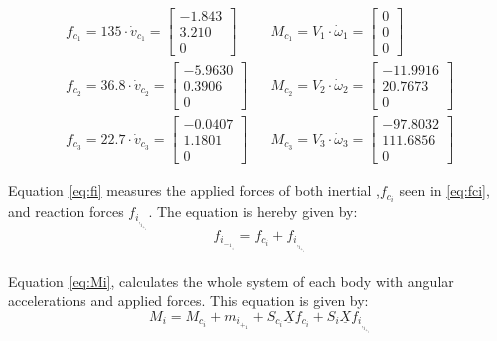 \begin{align}
    f_c_1=135\cdot \dot{v}_c_1=\left[\begin{matrix}
    -1.843\\
    3.210\\
    0
\end{matrix}\right]&&
    M_c_1=V_1\cdot \dot{\omega}_1=\left[\begin{matrix}
    0\\
    0\\
    0
\end{matrix}\right]\\
    f_c_2=36.8\cdot \dot{v}_c_2= \left[\begin{matrix}
    -5.9630\\
    0.3906\\
    0
\end{matrix}\right]&&
  M_c_2=V_2\cdot \dot{\omega}_2= \left[\begin{matrix}
    -11.9916\\
    20.7673\\
    0
\end{matrix}\right]\\
 f_c_3=22.7\cdot \dot{v}_c_3=\left[\begin{matrix}
    -0.0407\\
    1.1801\\
    0
\end{matrix}\right]&&
    M_c_3=V_3\cdot \dot{\omega}_3=\left[\begin{matrix}
    -97.8032\\
    111.6856\\
    0
\end{matrix}\right]
\end{align}

\noindent
Equation \ref{eq:fi} measures the applied forces of both inertial ,\(f_c_i\) seen in \ref{eq:fci}, and reaction forces \(f_i_,_i_+_1\). The equation is hereby given by:\\
\begin{equation}\label{eq:fi}
    f_i_-_1_,_i=f_c_i+f_i_,_i_+_1
\end{equation} \\

Equation \ref{eq:Mi}, calculates the whole system of each body with angular accelerations and applied forces. This equation is given by:\\

\begin{equation}\label{eq:Mi}
    M_i=M_c_i+m_i_+_1+S_c_i\underline{X}f_c_i+S_i\underline{X}f_i_,_i_+_i
\end{equation} \\

